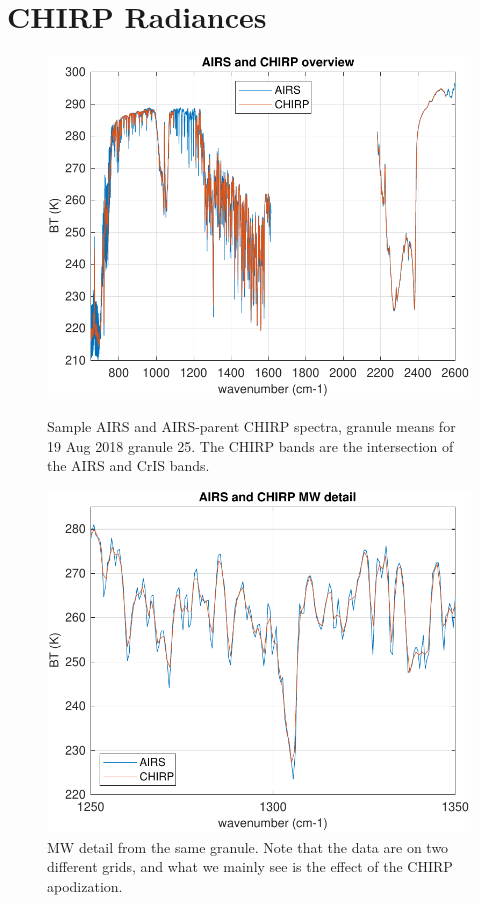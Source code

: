 \documentclass[12pt]{article}
\begin{document}
\section{CHIRP Radiances}
\label{rad}

\begin{figure}
  \centering
  \begin{minipage}[t]{0.45\textwidth}
    \centering
    \includegraphics[width=\textwidth]{figures/airs_and_chirp_overview.pdf}
    \caption{Sample AIRS and AIRS-parent CHIRP spectra, granule means
      for 19 Aug 2018 granule 25.  The CHIRP bands are the intersection
      of the AIRS and CrIS bands.}
    \label{fig1}
  \end{minipage}\hfill
  \begin{minipage}[t]{0.45\textwidth}
    \centering
    \includegraphics[width=\textwidth]{figures/airs_and_chirp_mw_detail.pdf}
    \caption{MW detail from the same granule.  Note that the data
      are on two different grids, and what we mainly see is the
      effect of the CHIRP apodization.}
    \label{fig2}
  \end{minipage}
\end{figure}
\end{document}
